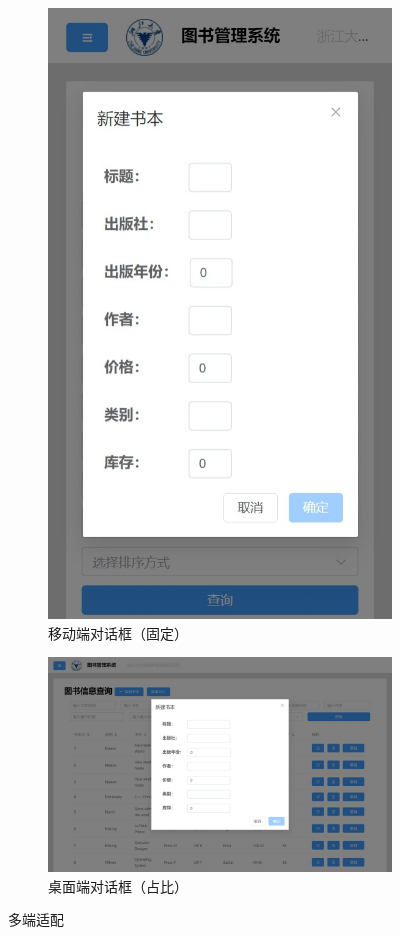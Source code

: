 \documentclass[a4paper,oneside]{ctexbook}
\begin{document}
\begin{figure}[!ht]
\begin{subfigure}{.2\linewidth}
        \includegraphics[width=0.8\linewidth]{diag-small.jpeg}
        \caption{移动端对话框（固定）}
        \label{fig:diag-small}
    \end{subfigure}%
    \begin{subfigure}{.5\linewidth}
        \centering
        \includegraphics[width=0.9\linewidth]{diag-large.jpeg}
        \caption{桌面端对话框（占比）}
        \label{fig:diag-large}
    \end{subfigure}
    \caption{多端适配}
    \label{fig:compat}
\end{figure}
\end{document}
